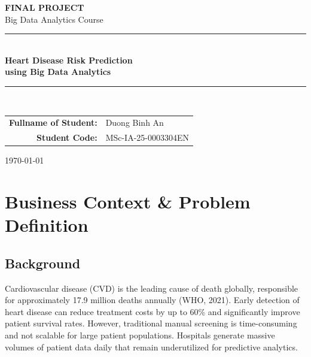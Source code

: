 \documentclass[12pt,a4paper]{article}
\begin{document}
\begin{titlepage}
    \centering
    \vspace*{2cm}

    {\Huge\bfseries FINAL PROJECT}\\[0.5cm]
    {\LARGE Big Data Analytics Course}\\[2cm]

    \rule{\linewidth}{0.5mm}\\[0.5cm]
    {\huge\bfseries Heart Disease Risk Prediction\\[0.3cm]
    using Big Data Analytics}\\[0.5cm]
    \rule{\linewidth}{0.5mm}\\[2cm]

    \begin{tabular}{rl}
        \textbf{Fullname of Student:} & Duong Binh An\\[0.5cm]
        \textbf{Student Code:} & MSc-IA-25-0003304EN\\[0.5cm]
    \end{tabular}

    \vfill

    {\large \today}
\end{titlepage}

\tableofcontents
\listoffigures
\listoftables
\newpage

\section{Business Context \& Problem Definition}

\subsection{Background}

Cardiovascular disease (CVD) is the leading cause of death globally, responsible for approximately 17.9 million deaths annually (WHO, 2021). Early detection of heart disease can reduce treatment costs by up to 60\% and significantly improve patient survival rates. However, traditional manual screening is time-consuming and not scalable for large patient populations. Hospitals generate massive volumes of patient data daily that remain underutilized for predictive analytics.
\end{document}
